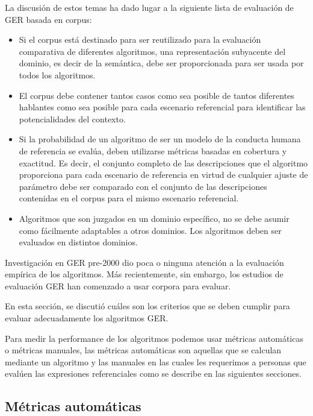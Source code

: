 La discusi\'on de estos temas ha dado lugar a la siguiente lista de evaluaci\'on de GER basada en corpus:
\begin{itemize}
\item Si el corpus est\'a destinado para ser reutilizado para la evaluaci\'on comparativa de diferentes
algoritmos, una representaci\'on subyacente del dominio, es decir de la sem\'antica, debe ser proporcionada para ser usada por todos los algoritmos.

\item El corpus debe contener tantos casos como sea posible de tantos diferentes hablantes como sea posible para cada escenario referencial para identificar las potencialidades del contexto. 

\item Si la probabilidad de un algoritmo de ser un modelo de la conducta humana de referencia
se eval\'ua, deben utilizarse m\'etricas basadas en cobertura y exactitud. Es decir, el conjunto completo de las descripciones que el algoritmo proporciona para cada
escenario de referencia en virtud de cualquier ajuste de par\'ametro debe ser comparado con el
conjunto de las descripciones contenidas en el corpus para el mismo escenario referencial.

\item Algoritmos que son juzgados en un dominio espec\'ifico, no se debe asumir como
f\'acilmente adaptables a otros dominios. Los algoritmos deben ser evaluados en distintos dominios.
\end{itemize}

Investigaci\'on en GER pre-2000 dio poca o ninguna atenci\'on a la evaluaci\'on emp\'irica de los algoritmos. M\'as 
recientemente, sin embargo, los estudios de evaluaci\'on GER han comenzado a usar corpora para evaluar.

En esta secci\'on, se discuti\'o cu\'ales son los criterios que se deben cumplir
para evaluar adecuadamente los algoritmos GER.

Para medir la performance de los algoritmos podemos usar m\'etricas autom\'aticas o m\'etricas manuales, las m\'etricas autom\'aticas son aquellas que se calculan mediante un algoritmo y las manuales en las cuales les requerimos a personas que eval\'uen las expresiones referenciales como se describe en las siguientes secciones.


\subsection{M\'etricas autom\'aticas}
\label{sec:metricasAutomaticas}

